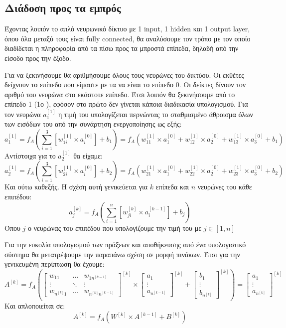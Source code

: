 \subsection{Διάδοση προς τα εμπρός}
Έχοντας λοιπόν το απλό νευρωνικό δίκτυο με 1 input, 1 hidden και 1 output layer, όπου όλα
μεταξύ τους είναι fully connected, θα αναλύσουμε τον τρόπο με τον οποίο διαδίδεται η
πληροφορία από τα πίσω προς τα μπροστά επίπεδα, δηλαδή από την είσοδο προς την έξοδο.

Για να ξεκινήσουμε θα αριθμήσουμε όλους τους νευρώνες του δικτύου. Οι εκθέτες δείχνουν
το επίπεδο που είμαστε με τα  να είναι το επίπεδο 0. Οι δείκτες δίνουν τον αριθμό του
νευρώνα στο εκάστοτε επίπεδο. Έτσι λοιπόν θα ξεκινήσουμε από το επίπεδο 1 (1ο ),
εφόσον στο πρώτο δεν γίνεται κάποια διαδικασία υπολογισμού. Για τον νευρώνα $a_1^{[1]}$
η τιμή του υπολογίζεται περνώντας το σταθμισμένο άθροισμα όλων των εισόδων του από
την συνάρτηση ενεργοποίησης ως εξής:
$$a_1^{[1]}=f_A\left(\sum\limits_{i=1}^3\left[ w_{1i}^{[1]}\times a_i^{[0]}\right]+b_1\right)=f_A\left( w_{11}^{[1]}\times a_1^{[0]}+w_{12}^{[1]}\times a_2^{[0]}+w_{13}^{[1]}\times a_3^{[0]}+b_1\right)$$
Αντίστοιχα για το $a_2^{[1]}$
θα είχαμε:
$$a_2^{[1]}=f_A\left(\sum\limits_{i=1}^3\left[ w_{2i}^{[1]}\times a_i^{[0]}\right]+b_2\right)=f_A\left( w_{21}^{[1]}\times a_1^{[0]}+w_{22}^{[1]}\times a_2^{[0]}+w_{23}^{[1]}\times a_3^{[0]}+b_2\right)$$
Και ούτω καθεξής. Η σχέση αυτή γενικεύεται για $k$ επίπεδα και $n$ νευρώνες του κάθε
επιπέδου:
$$a_j^{[k]}=f_A\left(\sum\limits_{i=1}^n\left[ w_{ji}^{[k]}\times a_i^{[k-1]}\right]+b_j\right)$$
Όπου $j$ ο νευρώνας του επιπέδου που υπολογίζουμε την τιμή του με $j \in [1, n]$

Για την ευκολία υπολογισμού των πράξεων και αποθήκευσης από ένα υπολογιστικό σύστημα
θα μετατρέψουμε την παραπάνω σχέση σε μορφή πινάκων. Έτσι για την γενικευμένη
περίπτωση θα έχουμε:
$$
A^{[k]}=f_A\left(
\begin{bmatrix}
    w_{11}     & \dots     & w_{1n^{[k-1]}} \\
    \vdots     & \ddots    & \vdots \\
    w_{n^{[k]}1}   & \dots     & w_{n^{[k]}n^{[k-1]}}
\end{bmatrix}
^{[k]}
\times
\begin{bmatrix}
    a_1 \\
    \vdots \\
    a_{n^{[k-1]}}
\end{bmatrix}
^{[k]}
+
\begin{bmatrix}
    b_1 \\
    \vdots \\
    b_{n^{[k]}}
\end{bmatrix}
^{[k]}
\right)
=
\begin{bmatrix}
    a_1 \\
    \vdots \\
    a_{n^{[k]}}
\end{bmatrix}
^{[k]}
$$
Και απλοποιείται σε:
$$A^{[k]}=f_A(W^{[k]}\times A^{[k-1]}+B^{[k]})$$

